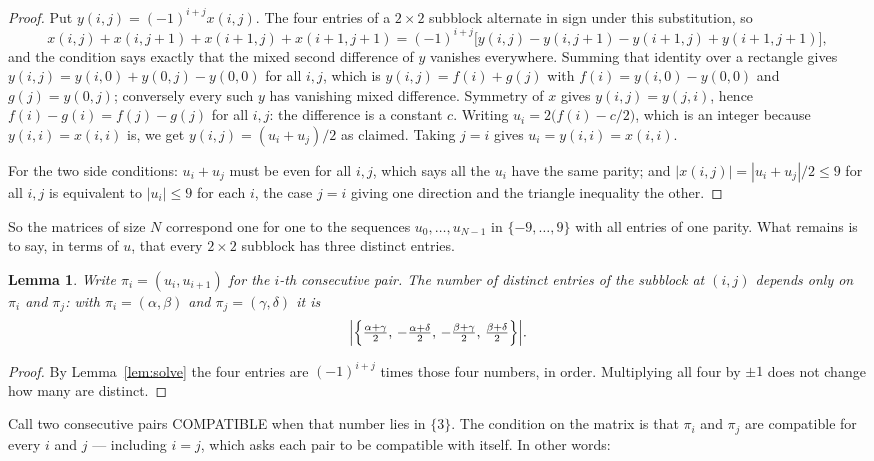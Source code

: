 \documentclass[11pt,a4paper]{article}
\theoremstyle{plain}
\newtheorem{lemma}[theorem]{Lemma}
\theoremstyle{definition}
\begin{document}
\begin{proof}
Put $y(i,j)=(-1)^{i+j}x(i,j)$. The four entries of a $2\times2$ subblock alternate in sign
under this substitution, so
\[
x(i,j)+x(i,j{+}1)+x(i{+}1,j)+x(i{+}1,j{+}1)
=(-1)^{i+j}\bigl[y(i,j)-y(i,j{+}1)-y(i{+}1,j)+y(i{+}1,j{+}1)\bigr],
\]
and the condition says exactly that the mixed second difference of $y$ vanishes everywhere.
Summing that identity over a rectangle gives
$y(i,j)=y(i,0)+y(0,j)-y(0,0)$ for all $i,j$, which is $y(i,j)=f(i)+g(j)$ with
$f(i)=y(i,0)-y(0,0)$ and $g(j)=y(0,j)$; conversely every such $y$ has vanishing mixed
difference. Symmetry of $x$ gives $y(i,j)=y(j,i)$, hence $f(i)-g(i)=f(j)-g(j)$ for all $i,j$:
the difference is a constant $c$. Writing $u_i=2\bigl(f(i)-c/2\bigr)$, which is an integer
because $y(i,i)=x(i,i)$ is, we get $y(i,j)=(u_i+u_j)/2$ as claimed. Taking $j=i$ gives
$u_i=y(i,i)=x(i,i)$.

For the two side conditions: $u_i+u_j$ must be even for all $i,j$, which says all the $u_i$ have
the same parity; and $|x(i,j)|=|u_i+u_j|/2\le9$ for all $i,j$ is equivalent to $|u_i|\le9$
for each $i$, the case $j=i$ giving one direction and the triangle inequality the other.
\end{proof}

So the matrices of size $N$ correspond one for one to the sequences $u_0,\dots,u_{N-1}$ in
$\{-9,\dots,9\}$ with all entries of one parity. What remains is to say, in terms of $u$,
that every $2\times2$ subblock has three distinct entries.

\begin{lemma}\label{lem:block}
Write $\pi_i=(u_i,u_{i+1})$ for the $i$-th consecutive pair. The number of distinct entries of
the subblock at $(i,j)$ depends only on $\pi_i$ and $\pi_j$: with $\pi_i=(\alpha,\beta)$ and
$\pi_j=(\gamma,\delta)$ it is
\[
\Bigl|\Bigl\{\tfrac{\alpha+\gamma}{2},\,-\tfrac{\alpha+\delta}{2},\,
-\tfrac{\beta+\gamma}{2},\,\tfrac{\beta+\delta}{2}\Bigr\}\Bigr| .
\]
\end{lemma}

\begin{proof}
By Lemma~\ref{lem:solve} the four entries are $(-1)^{i+j}$ times those four numbers, in
order. Multiplying all four by $\pm1$ does not change how many are distinct.
\end{proof}

Call two consecutive pairs COMPATIBLE when that number lies in $\{3\}$. The condition on the
matrix is that $\pi_i$ and $\pi_j$ are compatible for every $i$ and $j$ --- including $i=j$,
which asks each pair to be compatible with itself. In other words:
\end{document}
